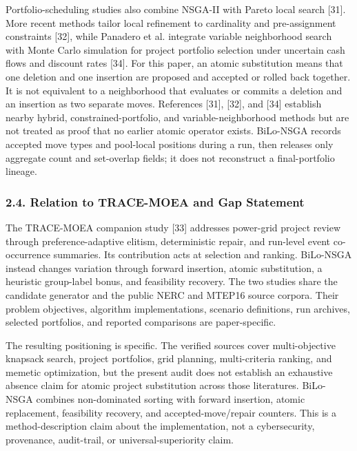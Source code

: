 \documentclass[
]{article}
\begin{document}
Portfolio-scheduling studies also combine NSGA-II with Pareto local search {[}31{]}. More recent methods tailor local refinement to cardinality and pre-assignment constraints {[}32{]}, while Panadero et al. integrate variable neighborhood search with Monte Carlo simulation for project portfolio selection under uncertain cash flows and discount rates {[}34{]}. For this paper, an atomic substitution means that one deletion and one insertion are proposed and accepted or rolled back together. It is not equivalent to a neighborhood that evaluates or commits a deletion and an insertion as two separate moves. References {[}31{]}, {[}32{]}, and {[}34{]} establish nearby hybrid, constrained-portfolio, and variable-neighborhood methods but are not treated as proof that no earlier atomic operator exists. BiLo-NSGA records accepted move types and pool-local positions during a run, then releases only aggregate count and set-overlap fields; it does not reconstruct a final-portfolio lineage.

\subsubsection{2.4. Relation to TRACE-MOEA and Gap Statement}\label{relation-to-trace-moea-and-gap-statement}

The TRACE-MOEA companion study {[}33{]} addresses power-grid project review through preference-adaptive elitism, deterministic repair, and run-level event co-occurrence summaries. Its contribution acts at selection and ranking. BiLo-NSGA instead changes variation through forward insertion, atomic substitution, a heuristic group-label bonus, and feasibility recovery. The two studies share the candidate generator and the public NERC and MTEP16 source corpora. Their problem objectives, algorithm implementations, scenario definitions, run archives, selected portfolios, and reported comparisons are paper-specific.

The resulting positioning is specific. The verified sources cover multi-objective knapsack search, project portfolios, grid planning, multi-criteria ranking, and memetic optimization, but the present audit does not establish an exhaustive absence claim for atomic project substitution across those literatures. BiLo-NSGA combines non-dominated sorting with forward insertion, atomic replacement, feasibility recovery, and accepted-move/repair counters. This is a method-description claim about the implementation, not a cybersecurity, provenance, audit-trail, or universal-superiority claim.
\end{document}
